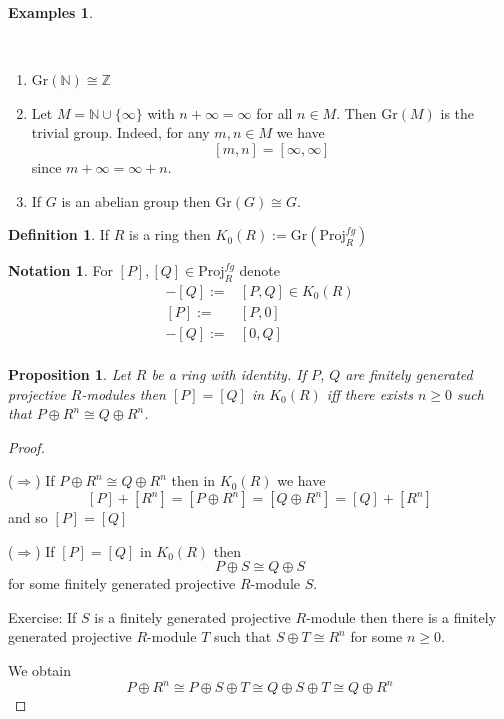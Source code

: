 \documentclass[12pt, letterpaper, oneside]{article}
\theoremstyle{plain}
\newtheorem{proposition}[theorem]{Proposition}
\theoremstyle{definition}
\newtheorem{definition}[theorem]{Definition}
\newtheorem{examples}[theorem]{Examples}
\newtheorem{notation}[theorem]{Notation}
\newcommand{\N}{{\mathbb N}}
\newcommand{\Z}{{\mathbb Z}}
\newcommand{\Projfg}{\mathrm {Proj}^{fg}}
\newcommand{\Gro}{\mathrm {Gr}}
\newcommand{\benu}{\begin{enumerate}}
\newcommand{\eenu}{\end{enumerate}}
\newcommand{\vs}{\vskip 5mm}
\newcommand{\isep}[1][0]{\setlength{\itemsep}{#1 mm}}
\begin{document}
\vs\vs

\begin{examples}\ 

\vskip -13mm

\ 
\benu
\isep[5]
\item $\Gro(\N) \cong \Z$
\item Let $M = \N\cup \{\infty\}$ with $n+ \infty = \infty$ for all $n\in M$.
Then  $\Gro(M)$ is the trivial group. Indeed, for any $m, n\in M$
we have 
$$[m, n] = [\infty, \infty]$$
since $m+\infty = \infty + n$.
\item If $G$ is an abelian group then $\Gro(G) \cong G$.
\eenu


\end{examples}


\vs\vs

\begin{definition}
If $R$ is a ring then $K_{0}(R) := \Gro(\Projfg_{R})$
\end{definition}


\vs\vs

\begin{notation}
For $[P], [Q]\in \Projfg_{R}$ denote 
\begin{align*}
[P] - [Q] := & [P, Q]\in K_{0}(R) \\
[P] := &  [P, 0] \\
-[Q] := & [0, Q] \\
\end{align*}
\end{notation}


\begin{proposition}
\label{PROP_EQUALITYINKZERO}
Let $R$ be a ring with identity. If $P$, $Q$ are finitely generated projective $R$-modules
then $[P] = [Q]$ in $K_{0}(R)$ iff there exists $n\geq 0$ such that $P\oplus R^{n} \cong Q\oplus R^{n}$.
\end{proposition}

\vs

\begin{proof} \ 

($\Rightarrow$) If $P\oplus R^{n} \cong Q\oplus R^{n}$ then in $K_{0}(R)$ we have 
$$[P]+[R^{n}] = [P\oplus R^{n}]= [Q\oplus R^{n}] = [Q] + [R^{n}]$$
and so $[P] = [Q]$

\vs

($\Rightarrow$) If $[P] = [Q]$ in $K_{0}(R)$ then 
$$P\oplus S \cong Q \oplus S$$
for some finitely generated projective $R$-module $S$. 

Exercise: If $S$ is a finitely generated projective $R$-module then there is 
a finitely generated projective $R$-module $T$ such that $S\oplus T \cong R^{n}$
for some $n\geq 0$. 

We obtain 
$$P\oplus R^{n} \cong P\oplus S \oplus T \cong Q \oplus S \oplus T \cong Q \oplus R^{n}$$


\end{proof}
\end{document}

